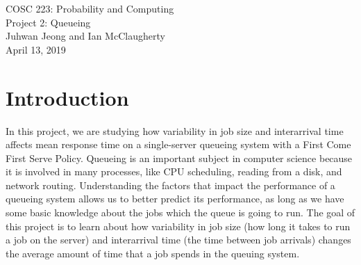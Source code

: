 \documentclass[12pt]{article}
\begin{document}
\begin{center}
\Large{COSC 223: Probability and Computing} \\
\Large{Project 2: Queueing} \\ 
\large{Juhwan Jeong and Ian McClaugherty} \\
\large{April 13, 2019}
\end{center}

\section{Introduction}
In this project, we are studying how variability in job size and interarrival time affects mean response time on a single-server queueing system with a First Come First Serve Policy. Queueing is an important subject in computer science because it is involved in many processes, like CPU scheduling, reading from a disk, and network routing. Understanding the factors that impact the performance of a queueing system allows us to better predict its performance, as long as we have some basic knowledge about the jobs which the queue is going to run. The goal of this project is to learn about how variability in job size (how long it takes to run a job on the server) and interarrival time (the time between job arrivals) changes the average amount of time that a job spends in the queuing system. 
\end{document}
